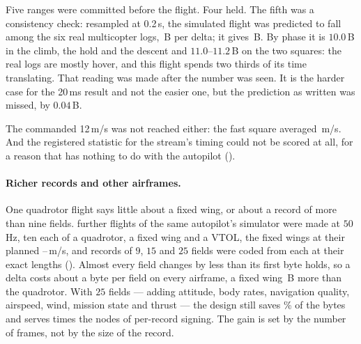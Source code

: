 \begin{remark}
Five ranges were committed before the flight. Four held. The fifth was a consistency check:
resampled at 0.2\,s, the simulated flight was predicted to fall among the six real multicopter
logs, \pxDeltaSlow\,B per delta; it gives \sitlCompare\,B. By phase it is $10.0$\,B in the
climb, the hold and the descent and $11.0$--$11.2$\,B on the two squares: the real logs are
mostly hover, and this flight spends two thirds of its time translating. That reading was made
after the number was seen. It is the harder case for the 20\,ms result and not the easier one,
but the prediction as written was missed, by $0.04$\,B.

The commanded 12\,m/s was not reached either: the fast square averaged \sitlSpeedFast\,m/s.
And the registered statistic for the stream's timing could not be scored at all, for a reason
that has nothing to do with the autopilot ().
\end{remark}

\paragraph{Richer records and other airframes.} One quadrotor flight says little about a fixed
wing, or about a record of more than nine fields. \afFlights{} further flights of the same
autopilot's simulator were made at $50$\,Hz, ten each of a quadrotor, a fixed wing and a VTOL,
the fixed wings at their planned \afSpeedLo--\afSpeedHi\,m/s, and records of $9$, $15$ and $25$
fields were coded from each at their exact lengths (). Almost every field
changes by less than its first byte holds, so a delta costs about a byte per field on every
airframe, a fixed wing \afWingExtra\,B more than the quadrotor. With $25$ fields --- adding
attitude, body rates, navigation quality, airspeed, wind, mission state and thrust --- the design
still saves \afSaveTwentyFive\% of the bytes and serves \afRatioTwentyFive{} times the nodes of
per-record signing. The gain is set by the number of frames, not by the size of the record.

